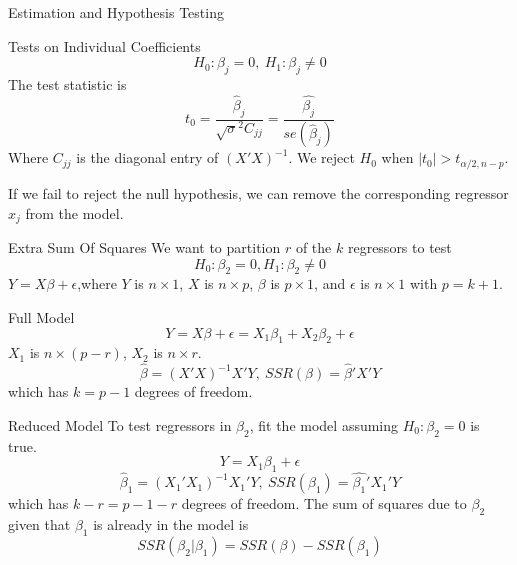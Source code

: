 \documentclass{article}
\begin{document}
\begin{multicols*}{3}
\begin{blackbox}{Estimation and Hypothesis Testing}
\begin{bluebox}{Tests on Individual Coefficients}
            \[H_0: \beta_j = 0, \ H_1: \beta_j \neq 0\]
            The test statistic is \\[-1ex]
            \[t_0 = \frac{\hat{\beta}_j}{\sqrt{\sigma}^2C_{jj}} = \frac{\hat{\beta_j}}{se(\hat{\beta}_j)}\]
            Where $C_{jj}$ is the diagonal entry of $(X'X)^{-1}$. We reject $H_0$ when $|t_0| > t_{\alpha/2, n-p}$.
        \end{bluebox}
        If we fail to reject the null hypothesis, we can remove the corresponding regressor $x_j$ from the model.
    \end{blackbox}
    \begin{blackbox}{Extra Sum Of Squares}
        We want to partition $r$ of the $k$ regressors to test \\[-2ex]
        \[H_0: \beta_2 = 0, H_1: \beta_2 \neq 0\]
        $Y = X\beta + \epsilon$,where $Y$ is $n\times 1$, $X$ is $n\times p$, $\beta$ is $p\times 1$, and $\epsilon$ is $n \times 1$ with $p = k+1$.
        \begin{redbox}{Full Model}
            \[Y = X\beta + \epsilon = X_1\beta_1 + X_2\beta_2 + \epsilon\] 
            $X_1$ is $n \times (p-r)$, $X_2$ is $n\times r$.\\[-2ex]
           \[\hat{\beta} = (X'X)^{-1}X'Y, \ SSR(\beta) = \hat{\beta}'X'Y\]
           which has $k = p-1$ degrees of freedom.
        \end{redbox}
        \begin{brownbox}{Reduced Model}
            To test regressors in $\beta_2$, fit the model assuming $H_0: \beta_2 = 0$ is true. \\[-3ex]
            \[Y = X_1\beta_1 + \epsilon\]
            \[\hat{\beta}_1 = (X_1'X_1)^{-1}X_1'Y, \ SSR(\beta_1) = \hat{\beta_1}'X_1'Y\]
            which has $k-r = p - 1 - r$ degrees of freedom. The sum of squares due to $\beta_2$ given that $\beta_1$ is already in the model is \\[-3ex]
            \[SSR(\beta_2 | \beta_1) = SSR(\beta) - SSR(\beta_1)\]
        \end{brownbox}
            

\end{blackbox}
\end{multicols*}
\end{document}
